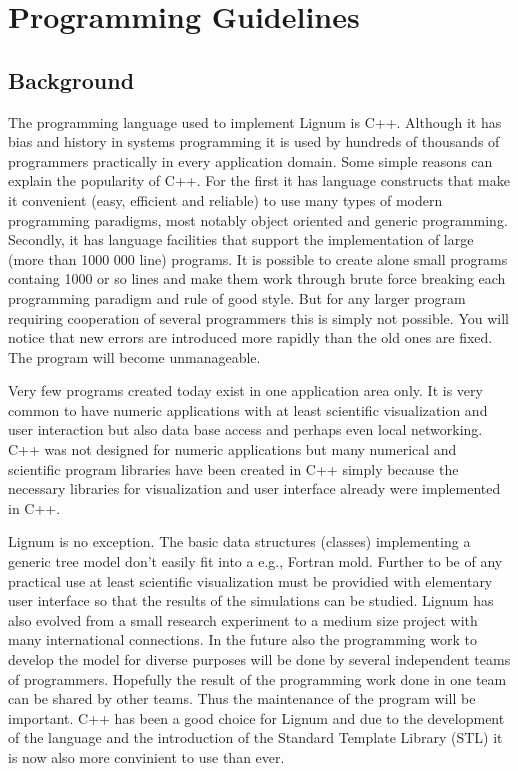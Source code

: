 \chapter{Programming Guidelines}

\section{Background}
The programming language used to  implement Lignum is C++. Although it
has bias and history in systems  programming it is used by hundreds of
thousands of programmers practically in every application domain. Some
simple reasons can explain the popularity of C++. For the first it has
language  constructs  that make  it  convenient  (easy, efficient  and
reliable)  to use  many types  of modern  programming  paradigms, most
notably  object oriented  and generic  programming.  Secondly,  it has
language  facilities that  support the  implementation of  large (more
than 1000  000 line) programs.  It  is possible to  create alone small
programs containg  1000 or so lines  and make them  work through brute
force breaking each  programming paradigm and rule of  good style. But
for any  larger program  requiring cooperation of  several programmers
this  is simply not  possible.  You  will notice  that new  errors are
introduced more rapidly than the old ones are fixed.  The program will
become unmanageable.

Very few programs created today exist in one application area only. It
is very common  to have numeric applications with  at least scientific
visualization  and user  interaction  but also  data  base access  and
perhaps  even local  networking.   C++ was  not  designed for  numeric
applications but many numerical  and scientific program libraries have
been  created  in  C++  simply  because the  necessary  libraries  for
visualization and user interface already were implemented in C++. 

Lignum  is   no  exception.   The  basic   data  structures  (classes)
implementing  a generic  tree  model  don't easily  fit  into a  e.g.,
Fortran mold. Further  to be of any practical  use at least scientific
visualization must be providied with elementary user interface so that
the  results of  the  simulations  can be  studied.   Lignum has  also
evolved from a small research experiment to a medium size project with
many international  connections.  In  the future also  the programming
work to develop the model for diverse purposes will be done by several
independent  teams  of  programmers.   Hopefully  the  result  of  the
programming work done  in one team can be shared  by other teams. Thus
the maintenance of the program will  be important. C++ has been a good
choice for Lignum  and due to the development of  the language and the
introduction of  the Standard  Template Library (STL)  it is  now also
more convinient to use than ever.

